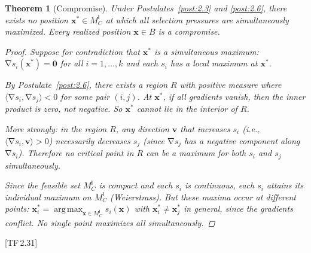 \documentclass[10pt]{article}
\theoremstyle{definition}
\theoremstyle{plain}
\newtheorem{theorem}[definition]{Theorem}
\theoremstyle{remark}
\newcommand{\MC}{M^{\mathsf{I}}_C}          %
\newcommand{\inner}[2]{\langle #1, #2 \rangle}
\DeclareMathOperator{\grad}{\nabla}
\DeclareMathOperator{\argmax}{arg\,max}
\newcommand{\TF}[1]{\textnormal{[TF\,#1]}}  %
\begin{document}
\begin{theorem}[Compromise]\label{thm:2.7}
Under Postulates~\ref{post:2.3} and \ref{post:2.6}, there exists no
position $\bm{x}^* \in \MC$ at which all selection pressures are
simultaneously maximized. Every realized position $\bm{x} \in B$
is a \emph{compromise}.

\begin{proof}
Suppose for contradiction that $\bm{x}^*$ is a simultaneous maximum:
$\grad s_i(\bm{x}^*) = \bm{0}$ for all $i = 1, \ldots, k$ and each
$s_i$ has a local maximum at $\bm{x}^*$.

By Postulate~\ref{post:2.6}, there exists a region $R$ with positive
measure where $\inner{\grad s_i}{\grad s_j} < 0$ for some pair $(i, j)$.
At $\bm{x}^*$, if all gradients vanish, then the inner product is zero,
not negative. So $\bm{x}^*$ cannot lie in the interior of $R$.

More strongly: in the region $R$, any direction $\bm{v}$ that increases
$s_i$ (i.e., $\inner{\grad s_i}{\bm{v}} > 0$) necessarily decreases
$s_j$ (since $\grad s_j$ has a negative component along $\grad s_i$).
Therefore no critical point in $R$ can be a maximum for both $s_i$ and
$s_j$ simultaneously.

Since the feasible set $\MC$ is compact and each $s_i$ is continuous,
each $s_i$ attains its individual maximum on $\MC$ (Weierstrass). But
these maxima occur at different points:
$\bm{x}_i^* = \argmax_{\bm{x} \in \MC} s_i(\bm{x})$ with
$\bm{x}_i^* \neq \bm{x}_j^*$ in general, since the gradients conflict.
No single point maximizes all simultaneously. \qedhere
\end{proof}
\end{theorem}

\TF{2.31}
\end{document}
